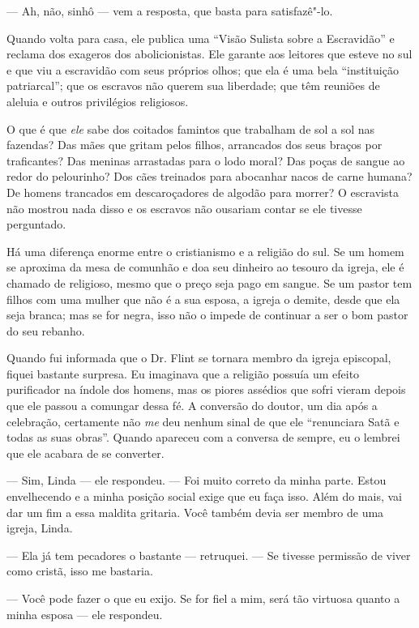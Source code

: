 --- Ah, não, sinhô --- vem a resposta, que basta para satisfazê"-lo.

Quando volta para casa, ele publica uma ``Visão Sulista sobre a
Escravidão'' e reclama dos exageros dos abolicionistas. Ele garante aos
leitores que esteve no sul e que viu a escravidão com seus próprios
olhos; que ela é uma bela ``instituição patriarcal''; que os escravos
não querem sua liberdade; que têm reuniões de aleluia e outros
privilégios religiosos.

O que é que \emph{ele} sabe dos
coitados famintos que trabalham de sol a sol nas fazendas? Das mães que
gritam pelos filhos, arrancados dos seus braços por traficantes? Das
meninas arrastadas para o lodo moral? Das poças de sangue ao redor do
pelourinho? Dos cães treinados para abocanhar nacos de carne humana? De
homens trancados em descaroçadores de algodão para morrer? O escravista
não mostrou nada disso e os escravos não ousariam contar se ele tivesse
perguntado.

Há
uma diferença enorme entre o cristianismo e a religião do sul. Se um
homem se aproxima da mesa de comunhão e doa seu dinheiro ao tesouro da
igreja, ele é chamado de religioso, mesmo que o preço seja pago em
sangue. Se um pastor tem filhos com uma mulher que não é a sua esposa, a
igreja o demite, desde que ela seja branca; mas se for negra, isso não o
impede de continuar a ser o bom pastor do seu rebanho.

Quando fui informada que o Dr. Flint se
tornara membro da igreja episcopal, fiquei bastante surpresa. Eu
imaginava que a religião possuía um efeito purificador na índole dos
homens, mas os piores assédios que sofri vieram depois que ele passou a
comungar dessa fé. A conversão do doutor, um dia após a celebração,
certamente não \emph{me} deu nenhum sinal de que ele ``renunciara Satã e
todas as suas obras''. Quando apareceu com a conversa de sempre, eu o
lembrei que ele acabara de se converter.

--- Sim, Linda --- ele respondeu. --- Foi muito correto da minha parte.
Estou envelhecendo e a minha posição social exige que eu faça isso. Além
do mais, vai dar um fim a essa maldita gritaria. Você também devia ser
membro de uma igreja, Linda.

--- Ela já tem pecadores o bastante ---
retruquei. --- Se tivesse permissão de viver como cristã, isso me
bastaria.

--- Você pode fazer o que eu exijo. Se
for fiel a mim, será tão virtuosa quanto a minha esposa --- ele
respondeu.

